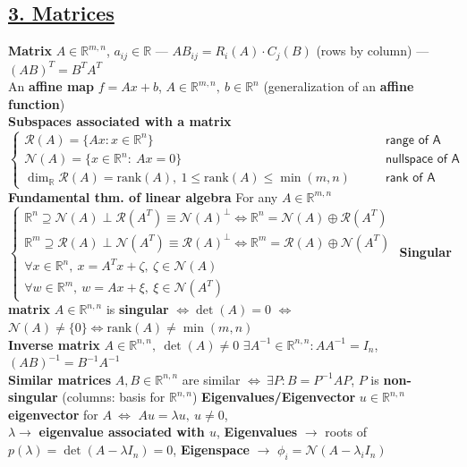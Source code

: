 \documentclass[a4paper]{article}
\begin{document}
\subsection*{\underline{3. Matrices}}
\textbf{Matrix} $A\in\mathbb{R}^{m,n}$, $a_{ij}\in\mathbb{R}$ --- $AB_{ij}=R_i(A) \cdot C_j(B)$ (rows by column) --- $(AB)^T = B^T A^T$\\
An \textbf{affine map} $f=Ax+b$, $A\in\mathbb{R}^{m,n}, \ b \in \mathbb{R}^n$ (generalization of an \textbf{affine function})\\
\textbf{Subspaces associated with a matrix} $\begin{cases}
    \mathcal{R}(A) = \{Ax: x\in\mathbb{R}^n\} &\qquad \textsf{range of A}\\
    \mathcal{N}(A) = \{x \in \mathbb{R}^n: \ Ax=0\} &\qquad  \textsf{nullspace of A}\\
    \dim_{\mathbb{R}} {\mathcal{R}(A)}=\text{rank}(A), \ 1 \le \text{rank}(A) \le \min(m,n) &\qquad \textsf{rank of A}
\end{cases}$\\
\textbf{Fundamental thm. of linear algebra} For any $A\in\mathbb{R}^{m,n}$ $\begin{cases}
    \mathbb{R}^n\supseteq\mathcal{N}(A) \perp \mathcal{R}(A^T)\equiv\mathcal{N}(A)^{\perp} \iff \mathbb{R}^n = \mathcal{N}(A) \oplus \mathcal{R}(A^T)\\ 
    \mathbb{R}^m\supseteq\mathcal{R}(A) \perp \mathcal{N}(A^T)\equiv\mathcal{R}(A)^{\perp} \iff \mathbb{R}^m = \mathcal{R}(A) \oplus \mathcal{N}(A^T)\\
    \forall x \in \mathbb{R}^n, \ x=A^T{x}+\zeta, \ \zeta \in \mathcal{N}(A)\\
    \forall w \in \mathbb{R}^m, \ w=Ax+\xi, \ \xi \in \mathcal{N}(A^T)
\end{cases}$
\textbf{Singular matrix} $A \in \mathbb{R}^{n,n}$ is \textbf{singular} $\iff \det(A)=0$ $\iff$ $\mathcal{N}(A)\ne\{0\} \iff \text{rank}(A)\ne\min(m,n)$\\
\textbf{Inverse matrix} $A\in\mathbb{R}^{n,n}, \ \det(A)\ne 0$ $\exists A^{-1}\in\mathbb{R}^{n,n}: AA^{-1}=I_n$,
$(AB)^{-1} = B^{-1} A^{-1}$\\
\textbf{Similar matrices} $A,B \in \mathbb{R}^{n,n}$ are similar $\iff \ \exists P: B = P^{-1}A P$, $P$ is \textbf{non-singular} (columns: basis for $\mathbb{R}^{n,n}$) 
\textbf{Eigenvalues/Eigenvector} $u\in\mathbb{R}^{n,n}$ \textbf{eigenvector} for $A \ \iff$ $Au=\lambda u, \ u \ne0$, \\
$\lambda \to$ \textbf{\small{eigenvalue associated with $u$}}, \textbf{Eigenvalues} $\to$ {\tiny{roots of}} $p(\lambda)=\det(A-\lambda{I_n})=0$, \textbf{Eigenspace} $\to$ $\phi_i=\mathcal{N}(A-\lambda_i{I_n})$\\
\end{document}
